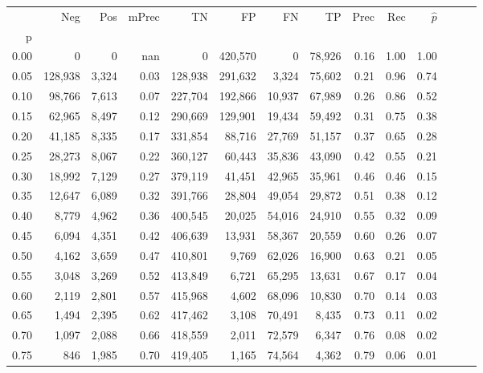 \begin{tabular}{rrrrrrrrrrrrrr}
\toprule
{} &      Neg &    Pos & mPrec &       TN &       FP &      FN &      TP &  Prec &   Rec & $\hat{p}$ \\
p    &          &        &       &          &          &         &         &       &       &           \\
\midrule
0.00 &        0 &      0 &   nan &        0 &  420,570 &       0 &  78,926 &  0.16 &  1.00 &      1.00 \\
0.05 &  128,938 &  3,324 &  0.03 &  128,938 &  291,632 &   3,324 &  75,602 &  0.21 &  0.96 &      0.74 \\
0.10 &   98,766 &  7,613 &  0.07 &  227,704 &  192,866 &  10,937 &  67,989 &  0.26 &  0.86 &      0.52 \\
0.15 &   62,965 &  8,497 &  0.12 &  290,669 &  129,901 &  19,434 &  59,492 &  0.31 &  0.75 &      0.38 \\
0.20 &   41,185 &  8,335 &  0.17 &  331,854 &   88,716 &  27,769 &  51,157 &  0.37 &  0.65 &      0.28 \\
0.25 &   28,273 &  8,067 &  0.22 &  360,127 &   60,443 &  35,836 &  43,090 &  0.42 &  0.55 &      0.21 \\
0.30 &   18,992 &  7,129 &  0.27 &  379,119 &   41,451 &  42,965 &  35,961 &  0.46 &  0.46 &      0.15 \\
0.35 &   12,647 &  6,089 &  0.32 &  391,766 &   28,804 &  49,054 &  29,872 &  0.51 &  0.38 &      0.12 \\
0.40 &    8,779 &  4,962 &  0.36 &  400,545 &   20,025 &  54,016 &  24,910 &  0.55 &  0.32 &      0.09 \\
0.45 &    6,094 &  4,351 &  0.42 &  406,639 &   13,931 &  58,367 &  20,559 &  0.60 &  0.26 &      0.07 \\
0.50 &    4,162 &  3,659 &  0.47 &  410,801 &    9,769 &  62,026 &  16,900 &  0.63 &  0.21 &      0.05 \\
0.55 &    3,048 &  3,269 &  0.52 &  413,849 &    6,721 &  65,295 &  13,631 &  0.67 &  0.17 &      0.04 \\
0.60 &    2,119 &  2,801 &  0.57 &  415,968 &    4,602 &  68,096 &  10,830 &  0.70 &  0.14 &      0.03 \\
0.65 &    1,494 &  2,395 &  0.62 &  417,462 &    3,108 &  70,491 &   8,435 &  0.73 &  0.11 &      0.02 \\
0.70 &    1,097 &  2,088 &  0.66 &  418,559 &    2,011 &  72,579 &   6,347 &  0.76 &  0.08 &      0.02 \\
0.75 &      846 &  1,985 &  0.70 &  419,405 &    1,165 &  74,564 &   4,362 &  0.79 &  0.06 &      0.01 \\

\end{tabular}
